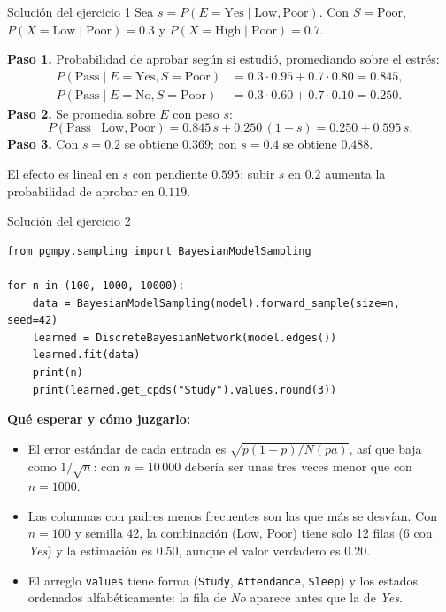 \documentclass[11pt]{beamer}
\newcommand{\Pp}[1]{P\!\left(#1\right)}
\begin{document}
\begin{frame}{Solución del ejercicio 1}
  Sea $s=\Pp{E=\text{Yes}\mid\text{Low},\text{Poor}}$. Con $S=\text{Poor}$, $\Pp{X=\text{Low}\mid\text{Poor}}=0.3$ y $\Pp{X=\text{High}\mid\text{Poor}}=0.7$.

  \medskip
  \textbf{Paso 1.} Probabilidad de aprobar según si estudió, promediando sobre el estrés:
  \begin{align*}
    \Pp{\text{Pass}\mid E=\text{Yes},S=\text{Poor}}&=0.3\cdot0.95+0.7\cdot0.80=0.845,\\
    \Pp{\text{Pass}\mid E=\text{No},S=\text{Poor}}&=0.3\cdot0.60+0.7\cdot0.10=0.250.
  \end{align*}
  \textbf{Paso 2.} Se promedia sobre $E$ con peso $s$:
  \[
    \Pp{\text{Pass}\mid\text{Low},\text{Poor}}=0.845\,s+0.250\,(1-s)=0.250+0.595\,s.
  \]
  \textbf{Paso 3.} Con $s=0.2$ se obtiene $0.369$; con $s=0.4$ se obtiene $0.488$.

  \medskip
  El efecto es lineal en $s$ con pendiente $0.595$: subir $s$ en $0.2$ aumenta la probabilidad de aprobar en $0.119$.
\end{frame}

\begin{frame}[fragile]{Solución del ejercicio 2}
\begin{lstlisting}
from pgmpy.sampling import BayesianModelSampling

for n in (100, 1000, 10000):
    data = BayesianModelSampling(model).forward_sample(size=n, seed=42)
    learned = DiscreteBayesianNetwork(model.edges())
    learned.fit(data)
    print(n)
    print(learned.get_cpds("Study").values.round(3))
\end{lstlisting}
  \small
  \textbf{Qué esperar y cómo juzgarlo:}
  \begin{itemize}
    \item El error estándar de cada entrada es $\sqrt{p(1-p)/N(pa)}$, así que baja como $1/\sqrt{n}$: con $n=10\,000$ debería ser unas tres veces menor que con $n=1000$.
    \item Las columnas con padres menos frecuentes son las que más se desvían. Con $n=100$ y semilla 42, la combinación (Low, Poor) tiene solo 12 filas (6 con \emph{Yes}) y la estimación es $0.50$, aunque el valor verdadero es $0.20$.
    \item El arreglo \texttt{values} tiene forma (\texttt{Study}, \texttt{Attendance}, \texttt{Sleep}) y los estados ordenados alfabéticamente: la fila de \emph{No} aparece antes que la de \emph{Yes}.
  \end{itemize}
\end{frame}
\end{document}
